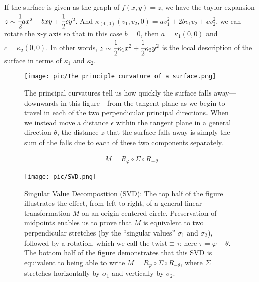 \documentclass[10pt]{article}
\begin{document}
            \begin{remark}
                If the surface is given as the graph of $f(x,y)=z$, we have the taylor expansion $z\sim\cfrac{1}{2}ax^2 + bxy + \cfrac{1}{2}cy^2$. And $\kappa_{(0,0)}(v_1,v_2,0) = av_1^2 + 2bv_1v_2 + cv_2^2$, we can rotate the x-y axis so that in this case $b=0$, then $a=\kappa_1(0,0)$ and $c=\kappa_2(0,0)$. In other words, $z\sim\cfrac{1}{2}\kappa_1x^2 + \cfrac{1}{2}\kappa_2y^2$ is the local description of the surface in terms of $\kappa_1$ and $\kappa_2$.
            \end{remark}

            \begin{figure}[H]
                \centering
                \texttt{[image: pic/The principle curvature of a surface.png]}
                \caption{The principal curvatures tell us how quickly the surface falls away—downwards in this figure—from the tangent plane as we begin to travel in each of the two perpendicular principal directions. When we instead move a distance $\epsilon$ within the tangent plane in a general direction $\theta$, the distance $z$ that the surface falls away is simply the sum of the falls due to each of these two components separately.}
            \end{figure}

            \begin{lemma}
                \begin{equation*}
                    \begin{aligned}
                        M = R_{\varphi}\circ\Sigma\circ R_{-\theta}
                    \end{aligned}
                \end{equation*}
            \end{lemma}

            \begin{figure}[H]
                \centering
                \texttt{[image: pic/SVD.png]}
                \caption{Singular Value Decomposition (SVD): The top half of the figure illustrates the effect, from left to right, of a general linear transformation $M$ on an origin-centered circle. Preservation of midpoints enables us to prove that $M$ is equivalent to two perpendicular stretches (by the “singular values” $\sigma_1$ and $\sigma_2$), followed by a rotation, which we call the twist$\equiv\tau$; here $\tau = \varphi-\theta$. The bottom half of the figure demonstrates that this SVD is equivalent to being able to write $M = R_{\varphi}\circ\Sigma\circ R_{-\theta}$, where $\Sigma$ stretches horizontally by $\sigma_1$ and vertically by $\sigma_2$.}
            \end{figure}
\end{document}
